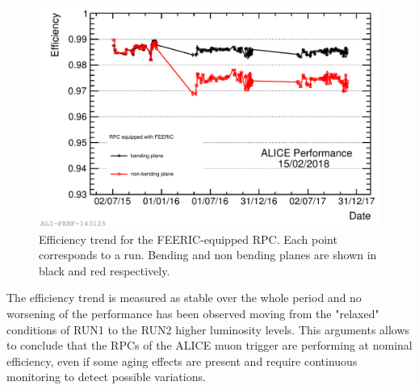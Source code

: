 \begin{figure}[!hb]
\begin{center}
\includegraphics[width=0.8\linewidth]{Chapters/Performance/Figs/2018-Feb-16-effTrend_2015-2017_FEERIC.pdf}
\caption{Efficiency trend for the FEERIC-equipped RPC. Each point corresponds to a run. Bending and non bending planes are shown in black and red respectively.}
\label{fig:MTRFEERICefficiency}
\end{center}
\end{figure}

The efficiency trend is measured as stable over the whole period and no worsening of the performance has been observed moving from the "relaxed" conditions of RUN1 to the RUN2 higher luminosity levels.
This arguments allows to conclude that the RPCs of the ALICE muon trigger are performing at nominal efficiency, even if some aging effects are present and require continuous monitoring to detect possible variations.
